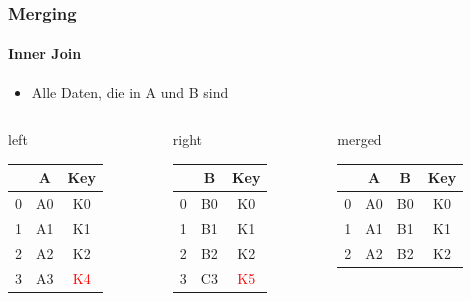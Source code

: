 \documentclass[12pt,ngerman]{beamer}
\def\firstcircle{(0,0) circle (2cm)}
\def\secondcircle{(0:3cm) circle (2cm)}
\begin{document}
\begin{frame}
\frametitle{Merging}
\framesubtitle{Inner Join}

\begin{itemize}
\item Alle Daten, die in A und B sind
\end{itemize}

\begin{center}
\end{center}

{\footnotesize
\begin{columns}
\begin{column}{0.3\textwidth}
left \\
\begin{tabular}{c|cc} \toprule
   & A  &  Key \\ \midrule
0 & A0 &  K0 \\
1 & A1 &  K1 \\ 
2 & A2 &  K2 \\
3 & A3 &  \textcolor{red}{K4} \\ \bottomrule
\end{tabular}
\end{column}
\begin{column}{0.3\textwidth}
right \\
\begin{tabular}{c|cc} \toprule
   &  B   & Key \\ \midrule
0 &  B0 & K0 \\
1 &  B1 & K1 \\ 
2 &  B2 & K2 \\
3 &  C3 & \textcolor{red}{K5} \\ \bottomrule
\end{tabular}\end{column}
\begin{column}{0.3\textwidth}
merged \\
\begin{tabular}{c|ccc} \toprule
   & A  & B   & Key \\ \midrule
0 & A0 & B0 & K0 \\
1 & A1 & B1 & K1 \\ 
2 & A2 & B2 & K2 \\ \bottomrule
\end{tabular} \\
\vspace*{1.5em}
\end{column}
\end{columns}}


\end{frame}
\end{document}
